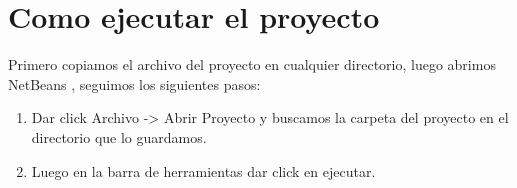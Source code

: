 \documentclass[a4paper,11pt]{article}
\begin{document}
\section{ Como ejecutar el proyecto}
Primero copiamos el archivo del proyecto en cualquier directorio, luego abrimos NetBeans , seguimos los siguientes pasos:
\begin{enumerate}
\item Dar click Archivo -> Abrir Proyecto y buscamos la carpeta del proyecto en el directorio que lo guardamos.
\item Luego en la barra de herramientas dar click en ejecutar.
\end{enumerate}
     
\begin{figure}[ht!]
 
   \centering
   \hspace{0.1\linewidth}
\hspace{0.1\linewidth}
\end{figure}

 
\end{document}
